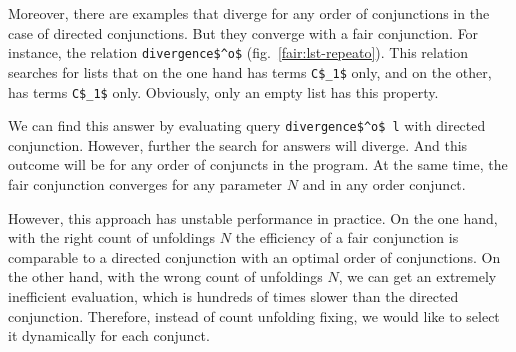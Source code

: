 Moreover, there are examples that diverge for any order of conjunctions in the case of directed conjunctions. But they converge with a fair conjunction.  For instance, the relation \lstinline{divergence$^o$} (fig.~\ref{fair:lst-repeato}). This relation searches for lists that on the one hand has terms \lstinline{C$_1$} only, and on the other, has terms \lstinline{C$_1$} only. Obviously, only an empty list has this property.

We can find this answer by evaluating query \lstinline{divergence$^o$ l} with directed conjunction. However, further the search for answers will diverge. And this outcome will be for any order of conjuncts in the program. At the same time, the fair conjunction converges for any parameter $N$ and in any order conjunct.

However, this approach has unstable performance in practice. On the one hand, with the right count of unfoldings $N$ the efficiency of a fair conjunction is comparable to a directed conjunction with an optimal order of conjunctions. On the other hand, with the wrong count of unfoldings $N$, we can get an extremely inefficient evaluation, which is hundreds of times slower than the directed conjunction. Therefore, instead of count unfolding fixing, we would like to select it dynamically for each conjunct.


